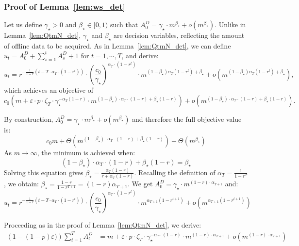 \documentclass[nonblindrev]{informs3noheader}
\begin{document}
\subsubsection*{Proof of Lemma~\ref{lem:ws_det}}
Let us define $\gamma_\star>0$ and $\beta_\star\in[0,1)$ such that $A_0^D=\gamma_\star\cdot m^{\beta_\star}+o\left(m^{\beta_\star}\right)$. Unlike in Lemma~\ref{lem:QtmN_det}, $\gamma_\star$ and $\beta_\star$ are decision variables, reflecting the amount of offline data to be acquired. As in Lemma~\ref{lem:QtmN_det}, we can define $u_t = A^D_0 + \sum_{s=1}^t A^{D}_s + 1$ for $t=1,\cdots,T$, and derive:
\begin{equation*}
    u_t=r^{-\frac{1}{1-r}\left(t-T\cdot\alpha_T\cdot(1-r^t)\right)}\cdot \left(\frac{c_0}{\gamma_\star}\right)^{\alpha_T\cdot(1-r^t)}\cdot m^{(1-\beta_\star)\alpha_T\left(1-r^t\right) + \beta_\star}+o\left(m^{(1-\beta_\star)\alpha_T\left(1-r^t\right) + \beta_\star}\right),
\end{equation*}
which achieves an objective of
$$c_0 \left(m + \varepsilon\cdot p\cdot\zeta_T\cdot \gamma_\star^{-\alpha_T(1-r)}\cdot m^{(1-\beta_\star)\cdot\alpha_T\cdot(1-r)+\beta_\star(1-r)}\right)+o\left(m^{(1-\beta_\star)\cdot\alpha_T\cdot(1-r)+\beta_\star(1-r)}\right).$$

By construction, $A^D_0 = \gamma_\star\cdot m^{\beta_\star}+ o(m^{\beta_\star})$ and therefore the full objective value is:
\[ c_0m + \Theta\left(m^{(1-\beta_\star)\cdot\alpha_T\cdot(1-r)+\beta_\star(1-r)}\right) + \Theta\left(m^{\beta_\star}\right)\]
As $m \to \infty$, the minimum is achieved when:
$$(1-\beta_\star)\cdot\alpha_T\cdot(1-r)+\beta_\star(1-r)=\beta_\star$$
Solving this equation gives $\beta_\star=\frac{\alpha_T(1-r)}{r+\alpha_T(1-r)}$. Recalling the definition of $\alpha_T=\frac{1}{1-r^T}$, we obtain: $\beta_\star=\frac{1-r}{1-r^{T+1}}=(1-r)\alpha_{T+1}$. We get $A^D_0 = \gamma_\star\cdot m^{(1-r)\cdot\alpha_{T+1}}$ and:
\begin{equation*}
    u_t=r^{-\frac{1}{1-r}\left(t-T\cdot\alpha_T\cdot(1-r^t)\right)}\cdot \left(\frac{c_0}{\gamma_\star}\right)^{\alpha_T\cdot(1-r^t)}\cdot m^{\alpha_{T+1}(1-r^{t+1})}+o\left(m^{\alpha_{T+1}(1-r^{t+1})}\right)
\end{equation*}

Proceeding as in the proof of Lemma~\ref{lem:QtmN_det}, we derive:
\begin{align*}
   \left(1-(1-p)\varepsilon)\right)\sum_{t=1}^T A^D_t
   &= m+\varepsilon\cdot p\cdot\zeta_T\cdot \gamma_\star^{-\alpha_T\cdot(1-r)}\cdot m^{(1-r)\cdot\alpha_{T+1}}+ o\left(m^{(1-r)\cdot\alpha_{T+1}}\right)
\end{align*}
\end{document}
